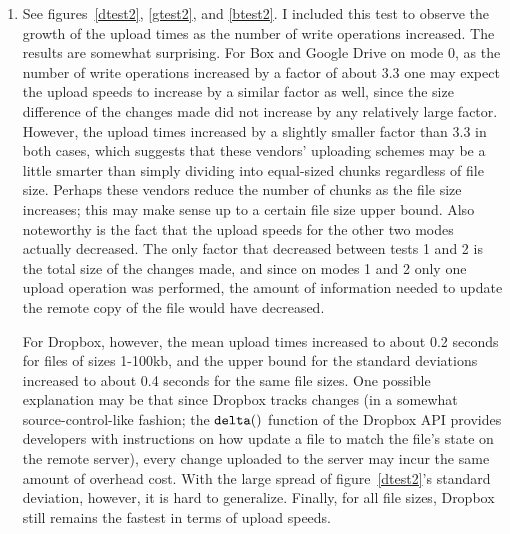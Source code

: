 \documentclass[pageno]{jpaper}
\begin{document}
\begin{enumerate}[label=Test \arabic*:,start=0]
\begin{center}
\CT
{}\quad
{}\quad
{}
\end{center}

\item See figures~\ref{dtest2}, \ref{gtest2}, and \ref{btest2}. I included this test to observe the growth of the upload times as the number of write operations increased. The results are somewhat surprising. For Box and Google Drive on mode 0, as the number of write operations increased by a factor of about 3.3 one may expect the upload speeds to increase by a similar factor as well, since the size difference of the changes made did not increase by any relatively large factor. However, the upload times increased by a slightly smaller factor than 3.3 in both cases, which suggests that these vendors' uploading schemes may be a little smarter than simply dividing into equal-sized chunks regardless of file size. Perhaps these vendors reduce the number of chunks as the file size increases; this may make sense up to a certain file size upper bound. Also noteworthy is the fact that the upload speeds for the other two modes actually decreased. The only factor that decreased between tests 1 and 2 is the total size of the changes made, and since on modes 1 and 2 only one upload operation was performed, the amount of information needed to update the remote copy of the file would have decreased.

For Dropbox, however, the mean upload times increased to about 0.2 seconds for files of sizes 1-100kb, and the upper bound for the standard deviations increased to about 0.4 seconds for the same file sizes. One possible explanation may be that since Dropbox tracks changes (in a somewhat source-control-like fashion; the $\tt{delta()}$ function of the Dropbox API provides developers with instructions on how update a file to match the file's state on the remote server), every change uploaded to the server may incur the same amount of overhead cost. With the large spread of figure~\ref{dtest2}'s standard deviation, however, it is hard to generalize. Finally, for all file sizes, Dropbox still remains the fastest in terms of upload speeds.

\begin{center}
\CT
{}\quad
{}\quad
{}
\end{center}


\end{enumerate}
\end{document}
